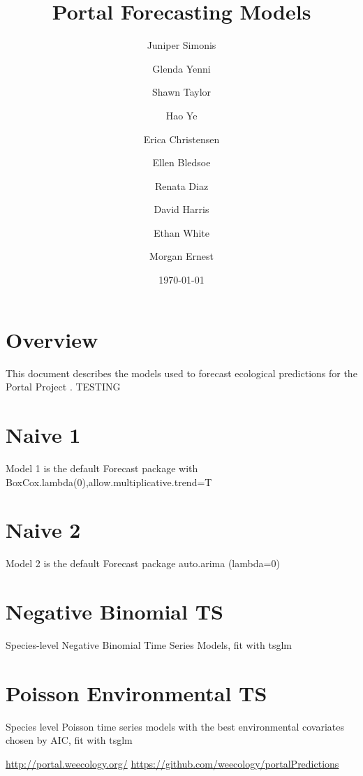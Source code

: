 \documentclass{article}
\title{Portal Forecasting Models}
\author[1]{Juniper Simonis}
\author[1]{Glenda Yenni}
\author[1]{Shawn Taylor}
\author[1]{Hao Ye}
\author[1]{Erica Christensen}
\author[1]{Ellen Bledsoe}
\author[1]{Renata Diaz}
\author[1]{David Harris}
\author[1]{Ethan White}
\author[1]{Morgan Ernest}
\affil[1]{Weecology Laboratory, University of Florida}
\date{\today}
\begin{document}
\maketitle
\tableofcontents

\section*{Overview}
\label{sec:overview}

This document describes the models used to forecast ecological predictions for the Portal Project \cite{portal, portalpredictions}. 
TESTING

\section{Naive 1}
\label{sec:naive01}

Model 1 is the default Forecast package with BoxCox.lambda(0),allow.multiplicative.trend=T

\section{Naive 2}
\label{sec:naive02}

Model 2 is the default Forecast package auto.arima (lambda=0)

\section{Negative Binomial TS}
\label{sec:neg_binom_ts}

Species-level Negative Binomial Time Series Models, fit with tsglm

\section{Poisson Environmental TS}
\label{sec:pois_env_ts}

Species level Poisson time series models with the best environmental covariates chosen by AIC, fit with tsglm

\begin{thebibliography}{9}
  \url{http://portal.weecology.org/}
  \url{https://github.com/weecology/portalPredictions}

\end{thebibliography}
\end{document}
